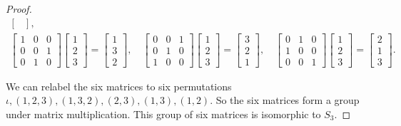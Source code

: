 \begin{proof}
\[\begin{split}
\begin{bmatrix}
            \end{bmatrix}, \\
            \begin{bmatrix}
                1 & 0 & 0 \\
                0 & 0 & 1 \\
                0 & 1 & 0
            \end{bmatrix}
            \begin{bmatrix}
                1 \\
                2 \\
                3
            \end{bmatrix} =
            \begin{bmatrix}
                1 \\
                3 \\
                2
            \end{bmatrix},\quad
            \begin{bmatrix}
                0 & 0 & 1 \\
                0 & 1 & 0 \\
                1 & 0 & 0
            \end{bmatrix}
            \begin{bmatrix}
                1 \\
                2 \\
                3
            \end{bmatrix} =
            \begin{bmatrix}
                3 \\
                2 \\
                1
            \end{bmatrix},\quad
            \begin{bmatrix}
                0 & 1 & 0 \\
                1 & 0 & 0 \\
                0 & 0 & 1
            \end{bmatrix}
            \begin{bmatrix}
                1 \\
                2 \\
                3
            \end{bmatrix} =
            \begin{bmatrix}
                2 \\
                1 \\
                3
            \end{bmatrix}.
        \end{split}
    \]

    We can relabel the six matrices to six permutations $\iota, (1, 2, 3), (1, 3, 2), (2, 3), (1, 3), (1, 2)$. So the six matrices form a group under matrix multiplication. This group of six matrices is isomorphic to $S_{3}$.
\end{proof}

